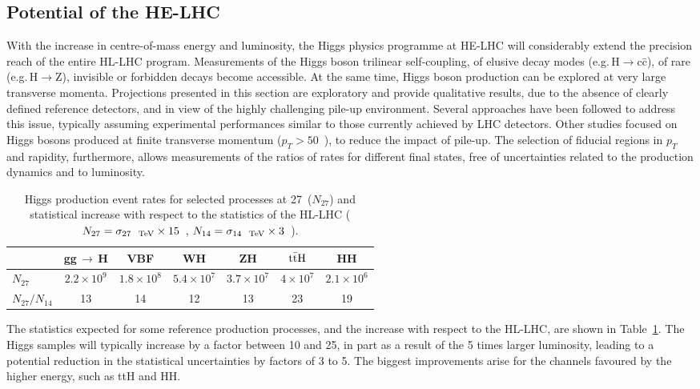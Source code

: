 \documentclass[../report.tex]{subfiles}
\begin{document}
\subsection{Potential of the HE-LHC}
With the increase in centre-of-mass energy and luminosity, the Higgs physics programme at HE-LHC will considerably extend the precision reach of the entire HL-LHC program. Measurements of the Higgs boson trilinear self-coupling, of elusive decay modes (e.g.\,H$\to$c\={c}), of rare (e.g.\,H$\to$Z\textgamma), invisible or forbidden decays become accessible. At the same time, Higgs boson production can be explored at very large transverse momenta.
Projections presented in this section are exploratory and provide qualitative results, due to the absence of clearly defined reference detectors, and in view of the highly challenging pile-up environment. Several approaches have been followed to address this issue, typically assuming experimental performances similar to those currently achieved by LHC detectors. Other studies focused on Higgs bosons produced at finite transverse momentum ($p_T>50$~\UGeV), to reduce the impact of pile-up. The selection of fiducial regions in $p_T$ and rapidity, furthermore, allows measurements of the ratios of rates for different final states, free of uncertainties related to the production dynamics and to luminosity. 

\begin{table}[h]
\centering
  \caption{\label{tab:Hrates}
Higgs production event rates for selected processes
    at 27~\UTeV ($N_{27}$) and
 statistical increase with 
 respect to the statistics of the HL-LHC ($N_{27}=\sigma_{27~\mathrm{~\text{TeV}}} \times 15$~\iab, 
 $N_{14}=\sigma_{14~\mathrm{~\text{TeV}}} \times 3$~\iab).} 
\begin{tabular}{|l|c|c|c|c|c|c|} 
\hline  \hline
&  gg\,$\to$\,H   & VBF &
 WH  &
 ZH  &
 $\rm t\bar{t}H$ &
 HH 
 \\ \hline
$N_{27}$  & $2.2\times 10^9$ & $1.8\times 10^8$ & $5.4\times 10^7$ & $3.7\times
 10^7$ &  $4\times 10^7$ & $2.1 \times 10^6$  \\
$N_{27}/N_{14}$ & 13 & 14 & 12 & 13 &23 & 19
\\ \hline
\hline
\end{tabular}
\end{table}
The statistics expected for some reference production processes, and the increase with respect to the HL-LHC, are shown in
Table~\ref{tab:Hrates}. The Higgs samples will typically increase by a factor between 10 and 25, in part as a result of the 5 times larger luminosity, leading to a potential reduction in the statistical uncertainties by factors of 3 to 5. The biggest improvements arise for the channels favoured by the higher energy, such as ttH and HH.
\end{document}
